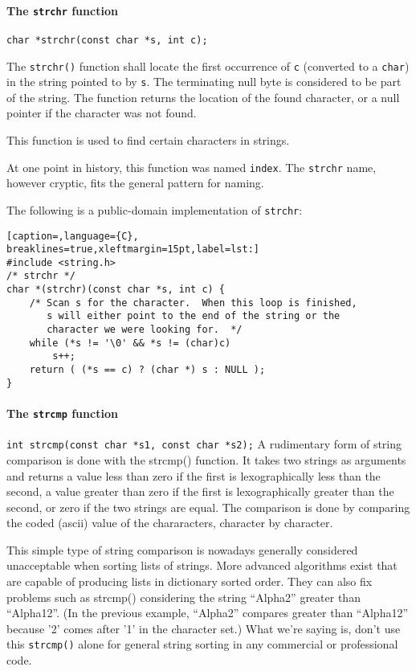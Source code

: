 \paragraph{The \texttt{strchr} function}
\texttt{char *strchr(const char *s, int c);}

The \texttt{strchr()} function shall locate the first occurrence of \texttt{c}
(converted to a \texttt{char}) in the string pointed to by \texttt{s}. The
terminating null byte is considered to be part of the string. The function
returns the location of the found character, or a null pointer if the character
was not found.

This function is used to find certain characters in strings.

At one point in history, this function was named \texttt{index}. The
\texttt{strchr} name, however cryptic, fits the general pattern for naming.

The following is a public-domain implementation of \texttt{strchr}:
\lstset{basicstyle=\scriptsize, numbers=left, captionpos=b, tabsize=4}
\begin{lstlisting}[caption=,language={C},
breaklines=true,xleftmargin=15pt,label=lst:]
#include <string.h>
/* strchr */
char *(strchr)(const char *s, int c) {
	/* Scan s for the character.  When this loop is finished,
	   s will either point to the end of the string or the
	   character we were looking for.  */
	while (*s != '\0' && *s != (char)c)
		s++;
	return ( (*s == c) ? (char *) s : NULL );
}
\end{lstlisting}

\paragraph{The \texttt{strcmp} function}
\texttt{int strcmp(const char *s1, const char *s2);}
A rudimentary form of string comparison is done with the strcmp() function. It
takes two strings as arguments and returns a value less than zero if the first
is lexographically less than the second, a value greater than zero if the first
is lexographically greater than the second, or zero if the two strings are
equal. The comparison is done by comparing the coded (ascii) value of the
chararacters, character by character.

This simple type of string comparison is nowadays generally considered
unacceptable when sorting lists of strings.  More advanced algorithms exist
that are capable of producing lists in dictionary sorted order. They can also
fix problems such as strcmp() considering the string ``Alpha2'' greater than
``Alpha12''. (In the previous example, ``Alpha2'' compares greater than
``Alpha12'' because '2' comes after '1' in the character set.) What we're
saying is, don't use this \texttt{strcmp()} alone for general string sorting in
any commercial or professional code.

